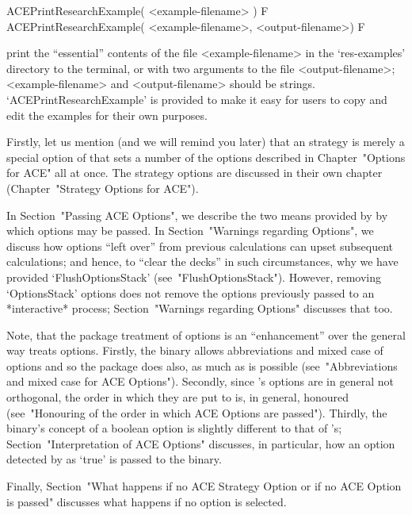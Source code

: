 \> ACEPrintResearchExample( <example-filename> ) F
\> ACEPrintResearchExample( <example-filename>, <output-filename>) F

print the ``essential'' contents of the file <example-filename> in the
`res-examples' directory to the terminal, or with two arguments to the
file  <output-filename>;  <example-filename>   and   <output-filename>
should be strings. `ACEPrintResearchExample' is provided  to  make  it
easy for users to copy and edit the examples for their own purposes.


Firstly, let us mention (and we will remind you later) that an  {\ACE}
strategy is merely a special option of {\ACE} that sets  a  number  of
the options described in Chapter~"Options for ACE" all  at  once.  The
strategy options are discussed in their own chapter (Chapter~"Strategy
Options for ACE").

In Section~"Passing ACE Options", we describe the two  means  provided
by {\GAP} by which {\ACE} options may be passed. In  Section~"Warnings
regarding Options", we discuss how options ``left over'' from previous
calculations can upset subsequent calculations; and hence, to  ``clear
the  decks''   in   such   circumstances,   why   we   have   provided
`FlushOptionsStack'   (see~"FlushOptionsStack").   However,   removing
`OptionsStack' options does not remove the options  previously  passed
to  an  *interactive*  {\ACE}  process;  Section~"Warnings   regarding
Options" discusses that too.

Note,  that  the  {\ACE}  package   treatment   of   options   is   an
``enhancement'' over the general way {\GAP} treats  options.  Firstly,
the {\ACE} binary allows abbreviations and mixed case of  options  and
so  the  {\ACE}  package  does  also,   as   much   as   is   possible
(see~"Abbreviations and mixed case for ACE Options"). Secondly,  since
{\ACE}'s options are in general not orthogonal,  the  order  in  which
they are put to {\ACE} is, in general, honoured (see~"Honouring of the
order in which ACE Options are passed"). Thirdly, the {\ACE}  binary's
concept of a boolean option is slightly different to that of {\GAP}'s;
Section~"Interpretation of ACE Options" discusses, in particular,  how
an option detected by {\GAP} as `true' is passed to the {\ACE} binary.

Finally, Section~"What happens if no ACE Strategy Option or if no  ACE
Option is passed" discusses what happens if no option is selected.

